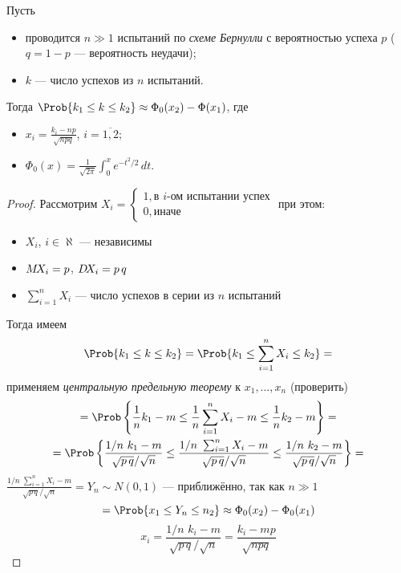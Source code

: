 \begin{thm}Пусть
	\begin{itemize}
		\item проводится $n \gg 1$ испытаний по \emph{схеме Бернулли} с вероятностью успеха $p$ ($q = 1 - p$ --- вероятность неудачи);
		\item $k$ --- число успехов из $n$ испытаний.
	\end{itemize}
	Тогда $\Prob \{ k_1 \leq k \leq k_2 \} \approx \Phi_0(x_2) - \Phi(x_1)$, где
	\begin{itemize}
		\item $x_i = \frac{k_i - np}{\sqrt{npq}}$, $i = \overline{1, 2}$;
		\item $\Phi_0(x) = \frac{1}{\sqrt{2\pi}} \int_{0}^{x} e^{-t^2/2}\, dt$.
	\end{itemize} 
\end{thm}
\begin{proof}
	Рассмотрим $X_i = \begin{cases*}
	1, \text{в } i \text{-ом испытании успех}\\
	0, \text{иначе}
	\end{cases*}$ при этом:
	\begin{itemize}
		\item $X_i$, $i \in \aleph$ --- независимы
		\item $M\!X_i = p$, $D\!X_i = p\,q$
		\item $\sum_{i=1}^{n} X_i$ --- число успехов в серии из $n$ испытаний
	\end{itemize} 
	Тогда имеем
	\[
		\Prob \{ k_1 \leq k \leq k_2 \} = \Prob \{ k_1 \leq \sum_{i=1}^{n} X_i \leq k_2 \} =
	\]
	применяем \emph{центральную предельную теорему} к $x_1, \dots, x_n$ (проверить)
	\begin{multline*}
		= \Prob \left\{ \frac{1}{n} k_1 - m \leq \frac{1}{n} \sum_{i=1}^{n} X_i - m \leq \frac{1}{n} k_2 - m \right\} = \\
		= \Prob \left\{ \frac{1/n \,\, k_1 - m}{\sqrt{p\,q}/\sqrt{n}} \leq \frac{1/n \,\, \sum_{i=1}^{n} X_i - m}{\sqrt{p\,q}/\sqrt{n}} \leq \frac{1/n \,\, k_2 - m}{\sqrt{p\,q}/\sqrt{n}} \right\} =
	\end{multline*}
	$\displaystyle \frac{1/n \,\, \sum_{i=1}^{n} X_i - m}{\sqrt{p\,q}/\sqrt{n}} = Y_n \sim N(0, 1)$ --- приближённо, так как $n \gg 1$
	\[
		= \Prob \{ x_1 \leq Y_n \leq n_2 \} \approx \Phi_0(x_2) - \Phi_0(x_1)
	\]
	\[
		x_i =  \frac{1/n \,\, k_i - m}{\sqrt{p\,q}/\sqrt{n}} = \frac{k_i - mp}{\sqrt{npq}}
	\]
\end{proof}

